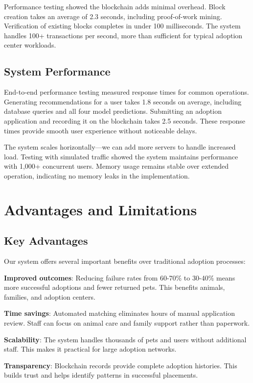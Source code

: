 \documentclass[conference]{IEEEtran}
\begin{document}
Performance testing showed the blockchain adds minimal overhead. Block creation takes an average of 2.3 seconds, including proof-of-work mining. Verification of existing blocks completes in under 100 milliseconds. The system handles 100+ transactions per second, more than sufficient for typical adoption center workloads.

\subsection{System Performance}

End-to-end performance testing measured response times for common operations. Generating recommendations for a user takes 1.8 seconds on average, including database queries and all four model predictions. Submitting an adoption application and recording it on the blockchain takes 2.5 seconds. These response times provide smooth user experience without noticeable delays.

The system scales horizontally—we can add more servers to handle increased load. Testing with simulated traffic showed the system maintains performance with 1,000+ concurrent users. Memory usage remains stable over extended operation, indicating no memory leaks in the implementation.

\section{Advantages and Limitations}

\subsection{Key Advantages}

Our system offers several important benefits over traditional adoption processes:

\textbf{Improved outcomes}: Reducing failure rates from 60-70\% to 30-40\% means more successful adoptions and fewer returned pets. This benefits animals, families, and adoption centers.

\textbf{Time savings}: Automated matching eliminates hours of manual application review. Staff can focus on animal care and family support rather than paperwork.

\textbf{Scalability}: The system handles thousands of pets and users without additional staff. This makes it practical for large adoption networks.

\textbf{Transparency}: Blockchain records provide complete adoption histories. This builds trust and helps identify patterns in successful placements.
\end{document}
